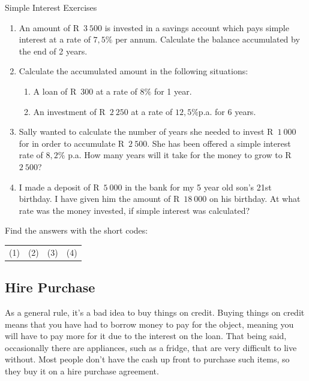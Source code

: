 \begin{exercises}{Simple Interest Exercises}
    \begin{enumerate}[label=\textbf{\arabic*}.]
	\item An amount of R~$3~500$ is invested in a savings account which pays simple interest at a rate of $7,5\%$ per annum. Calculate the balance accumulated by the end of 2 years.

	\item Calculate the accumulated amount in the following situations:
	\begin{enumerate}
	    \item A loan of R~$300$ at a rate of $8\%$ for 1 year.

	    \item An investment of R~$2~250$ at a rate of $12,5\%$p.a. for 6 years.
	\end{enumerate}

	\item Sally wanted to calculate the number of years she needed to invest R~$1~000$ for in order to accumulate R~$2~500$. She has been offered a simple interest rate of $8,2\%$ p.a. How many years will it take for the money to grow to R~$2~500$?

	\item I made a deposit of R~$5~000$ in the bank for my 5 year old son’s 21st birthday. I have given him the amount of R~$18~000$ on his birthday. At what rate was the money invested, if simple interest was calculated?\\
    \end{enumerate}

    Find the answers with the short codes:\\
    \begin{tabularx}{\textwidth}{ XXXX }
	(1)	&	(2)	&	(3)	&	(4)\\
    \end{tabularx}
\end{exercises}


\subsection{Hire Purchase}

As a general rule, it’s a bad idea to buy things on credit. Buying things on credit means that you have had to borrow money to pay for the object, meaning you will have to pay more for it due to the interest on the loan. That being said, occasionally there are appliances, such as a fridge, that are very difficult to live without. Most people don’t have the cash up front to purchase such items, so they buy it on a hire purchase agreement.\par

